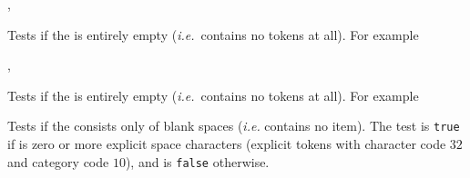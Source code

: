 \documentclass[oneside]{book}
\begin{document}
\begin{function}{\TlIfEmpty,\TlIfEmptyTF}
\begin{syntax}
 
   
\end{syntax}
Tests if the  is entirely empty
(\emph{i.e.}~contains no tokens at all). For example
\begin{demohigh}
 {} {}
\TlIfEmptyTF {} {} {}
\end{demohigh}
\end{function}

\begin{function}{\TlVarIfEmpty,\TlVarIfEmptyTF}
\begin{syntax}
 
   
\end{syntax}
Tests if the  is entirely empty
(\emph{i.e.}~contains no tokens at all). For example
\begin{demohigh}
\TlSet {}
\TlVarIfEmptyTF {} {}
\TlClear \lTmpaTl
\TlVarIfEmptyTF {} {}
\end{demohigh}
\end{function}

\begin{function}{\TlIfBlank}
\begin{syntax}
 
   
\end{syntax}
Tests if the  consists only of blank spaces
(\emph{i.e.} contains no item). The test is \texttt{true} if
 is zero or more explicit space characters
(explicit tokens with character code $32$ and category code $10$),
and is \texttt{false} otherwise.
\begin{demohigh}
\TlIfEmptyTF {  } {} {}
\TlIfBlankTF {  } {} {}
\end{demohigh}
\end{function}
\end{document}
